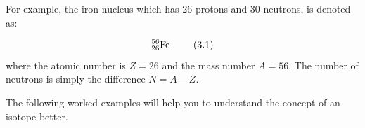 	\par
      \label{m38753*id255900}For example, the iron nucleus which has 26 protons and 30 neutrons, is
denoted as:\par 
      \label{m38753*id255904}\nopagebreak\noindent{}
        
    \begin{equation}
    _{26}^{56}\mathrm{Fe}\phantom{\rule{4pt}{0ex}}\tag{3.1}
      \end{equation}
      \label{m38753*id255929}where the atomic number is $Z=26$\hspace{1ex} and the mass number $A=56$.
The number of neutrons is simply the difference $N=A-Z$.\par 
        \label{m38753*id257512}The following worked examples will help you to understand the concept of an isotope better.\par \pagebreak
\label{m38753*secfhsst!!!underscore!!!id400}\vspace{.5cm} 
      \noindent
